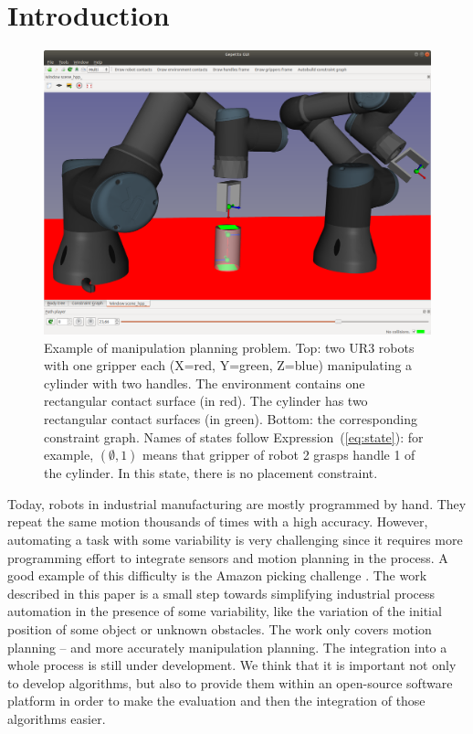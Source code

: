 \section{Introduction}

\begin{figure}
  \begin{center}
    \includegraphics[width=\linewidth]{figures/example.png}
    \def\svgwidth{\columnwidth}
    \graphicspath{{./figures/}}
    
  \end{center}
  \caption{{\color{blue} Example of manipulation planning problem.} Top: two UR3 robots with one gripper each (X=red, Y=green, Z=blue) manipulating a cylinder with two handles. The environment contains one rectangular contact surface (in red). The cylinder has two rectangular contact surfaces (in green).
  Bottom: the corresponding constraint graph. Names of states follow Expression~(\ref{eq:state}): for example, $(\emptyset,1)$ means that gripper of robot 2 grasps handle 1 of the cylinder. In this state, there is no placement constraint.}
  \label{fig:2ur3-cylinder}
\end{figure}

Today, robots in industrial manufacturing are mostly programmed by
hand. They repeat the same motion thousands of times with a high
accuracy. However, automating a task with some variability is very
challenging since it requires more programming effort to integrate
sensors and motion planning in the process. A good example of this difficulty is
the Amazon picking challenge \cite{brock-2018}. The work described in this
paper is a small step towards simplifying industrial process
automation in the presence of some variability, like the variation of
the initial position of some object or unknown
obstacles. The work only covers motion planning -- and
more accurately manipulation planning. The integration into a whole
process is still under development. We think that it
is important not only to develop algorithms, but also to provide them
within an open-source software platform in order to make the
evaluation and then the integration of those algorithms easier.

